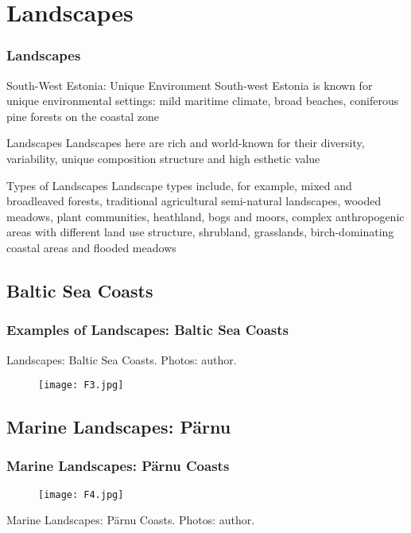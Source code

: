 \documentclass[pdflatex,compress,8pt,
	xcolor={dvipsnames,dvipsnames,svgnames,x11names,table},
	hyperref={	
	breaklinks = true, 
	pdfauthor={Lemenkova Polina}, 
	pdfsubject={Preentation}, 
	pdfcreator={Lemenkova Polina}, 
	pdfproducer={Lemenkova Polina}, 
	colorlinks=true,
	linkcolor=Tomato, 
	citecolor=DeepPink3, 
	urlcolor = NavyBlue, 
	breaklinks = true}]{beamer}
\begin{document}
\section{Landscapes}
\begin{frame}\frametitle{Landscapes}

\begin{block}{South-West Estonia: Unique Environment}
South-west Estonia is known for unique environmental settings: mild maritime climate, broad beaches, coniferous pine forests on the coastal zone
\end{block}

\begin{alertblock}{Landscapes}
Landscapes here are rich and world-known for their diversity, variability, unique composition structure and high esthetic value
\end{alertblock}

\begin{examples}{Types of Landscapes}
Landscape types include, for example, mixed and broadleaved forests, traditional agricultural semi-natural landscapes, wooded meadows, plant communities, heathland, bogs and moors, complex anthropogenic areas with different land use structure, shrubland, grasslands, birch-dominating coastal areas and flooded meadows
\end{examples}

\end{frame}

\subsection{Baltic Sea Coasts}
\begin{frame}\frametitle{Examples of Landscapes: Baltic Sea Coasts}
\begin{examples}{Landscapes:}
Baltic Sea Coasts. Photos: author.
\end{examples}
\begin{figure}[H]
	\centering
		\texttt{[image: F3.jpg]}
\end{figure}
\end{frame}

\subsection{Marine Landscapes: P\"{a}rnu}
\begin{frame}\frametitle{Marine Landscapes: P\"{a}rnu Coasts}
\vspace{3em}
\begin{figure}[H]
	\centering
		\texttt{[image: F4.jpg]}
\end{figure}
\begin{examples}{Marine Landscapes:}
 P\"{a}rnu Coasts. Photos: author.
\end{examples}
\end{frame}
\end{document}
